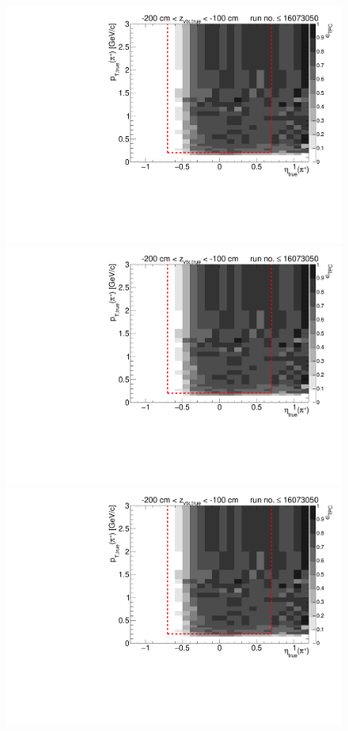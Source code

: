 \begin{figure}[hb]
{  \includegraphics[width=\linewidth,page=6]{graphics/eff/Eff2D_TPC_pion_Plus_RunRange1.pdf}\\
  \includegraphics[width=\linewidth,page=8]{graphics/eff/Eff2D_TPC_pion_Plus_RunRange1.pdf}\\
  \includegraphics[width=\linewidth,page=10]{graphics/eff/Eff2D_TPC_pion_Plus_RunRange1.pdf}
}%
\end{figure}
